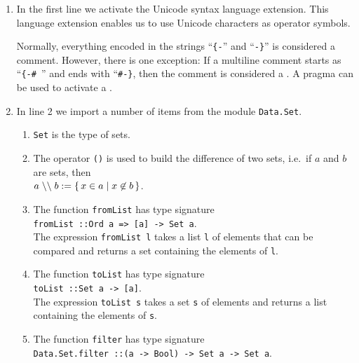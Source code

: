 \begin{enumerate}
\item In the first line we activate the Unicode syntax language extension.  This language extension enables us
      to use Unicode characters as operator symbols.

      Normally, everything encoded in the strings ``\texttt{\{-}'' and ``\texttt{-\}}'' is considered a comment.
      However, there is one exception:  If a multiline comment starts as ``\texttt{\{-\# }'' and ends
      with ``\texttt{\#-\}}, then the comment is considered a . A pragma can be used to activate a
      . 
\item In line 2 we import a number of items from the module \texttt{Data.Set}.
      \begin{enumerate}
      \item \texttt{Set} is the type of sets.
      \item The operator \texttt{()} is used to build the difference of two sets, i.e.~if
            $a$ and $b$ are sets, then
            \\[0.2cm]
            \hspace*{1.3cm}
            $a \;\mathtt{\symbol{92}\symbol{92}}\; b := \{\, x \in a \mid x \not\in b \,\}$.
      \item The function \texttt{fromList} has type signature
            \\[0.2cm]
            \hspace*{1.3cm}
            \texttt{fromList ::\;Ord a => [a] -> Set a}.
            \\[0.2cm]
            The expression \texttt{fromList l} takes a list \texttt{l} of elements that can be compared
            and returns a set containing the elements of \texttt{l}.
      \item The function \texttt{toList} has type signature
            \\[0.2cm]
            \hspace*{1.3cm}
            \texttt{toList ::\;Set a -> [a]}.
            \\[0.2cm]
            The expression \texttt{toList s} takes a set \texttt{s} of elements 
            and returns a list containing the elements of \texttt{s}.
      \item The function \texttt{filter} has type signature
            \\[0.2cm]
            \hspace*{1.3cm}
            \texttt{Data.Set.filter ::\;(a -> Bool) -> Set a -> Set a}.

\end{enumerate}
\end{enumerate}
